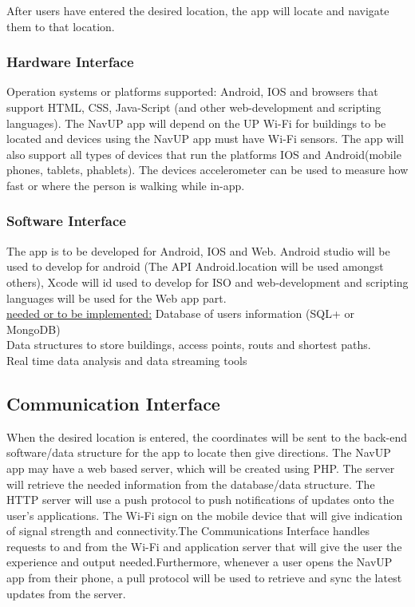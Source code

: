 \documentclass[12pt]{article}
\begin{document}
	
	After users have entered the desired location, the app will locate and navigate them to that location. \\
	
	
		\subsubsection{Hardware Interface}
		Operation systems or platforms supported: Android, IOS and browsers that support HTML, CSS, Java-Script (and other web-development and scripting languages). The NavUP app will depend on the UP Wi-Fi for buildings to be located and devices using the NavUP app must have Wi-Fi sensors.  The app will also support all types of devices that run the platforms IOS and Android(mobile phones, tablets, phablets). The devices accelerometer can be used to measure how fast or where the person is walking while in-app.
		
		
		\subsubsection{Software Interface}
		The app is to be developed for Android, IOS and Web. Android studio will be used to develop for android (The API Android.location will be used amongst others), Xcode will id used to develop for ISO and web-development and scripting languages will be used for the Web app part.\\
		
		\underline{needed or to be implemented:}
		Database of users information (SQL+ or MongoDB)\\
		Data structures to store buildings, access points, routs and shortest paths.\\
		Real time data analysis and data streaming tools\\
		
		
		\subsection{Communication Interface}
		When the desired location is entered, the coordinates will be sent to the back-end software/data structure for the app to locate then give directions. The NavUP app may have a web based server, which will be created using PHP. The server will retrieve the needed information from the database/data structure. The HTTP server will use a push protocol to push notifications of updates onto the user's applications. The Wi-Fi sign on the mobile device that will give indication of signal strength and connectivity.The Communications Interface handles requests to and from the Wi-Fi and application server that will give the user the experience and output needed.Furthermore, whenever a user opens the NavUP app from their phone, a pull protocol will be used to retrieve and sync the latest updates from the server.\\
		
\end{document}
